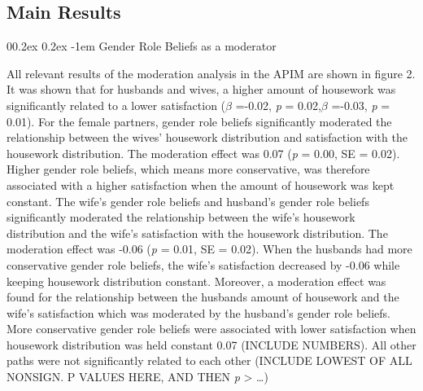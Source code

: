 \documentclass[
  man,floatsintext]{apa6}
\makeatletter
\let\oldparagraph\paragraph
\renewcommand{\paragraph}[1]{\oldparagraph{#1}\mbox{}}
\renewcommand{\paragraph}{\@startsection{paragraph}{4}{\parindent}%
  {0\baselineskip \@plus 0.2ex \@minus 0.2ex}%
  {-1em}%
  {\normalfont\normalsize\bfseries\itshape\typesectitle}}
\makeatother
\begin{document}
\hypertarget{main-results}{%
\subsection{Main Results}\label{main-results}}

\hypertarget{gender-role-beliefs-as-a-moderator}{%
\paragraph{Gender Role Beliefs as a moderator}\label{gender-role-beliefs-as-a-moderator}}

All relevant results of the moderation analysis in the APIM are shown in figure 2. It was shown that for husbands and wives, a higher amount of housework was significantly related to a lower satisfaction (\(\beta\) =-0.02, \emph{p} = 0.02,\(\beta\) =-0.03, \emph{p} = 0.01).
For the female partners, gender role beliefs significantly moderated the relationship between the wives' housework distribution and satisfaction with the housework distribution. The moderation effect was 0.07 (\emph{p} = 0.00, SE = 0.02). Higher gender role beliefs, which means more conservative, was therefore associated with a higher satisfaction when the amount of housework was kept constant. The wife's gender role beliefs and husband's gender role beliefs significantly moderated the relationship between the wife's housework distribution and the wife's satisfaction with the housework distribution. The moderation effect was -0.06 (\emph{p} = 0.01, SE = 0.02). When the husbands had more conservative gender role beliefs, the wife's satisfaction decreased by -0.06 while keeping housework distribution constant.
Moreover, a moderation effect was found for the relationship between the husbands amount of housework and the wife's satisfaction which was moderated by the husband's gender role beliefs. More conservative gender role beliefs were associated with lower satisfaction when housework distribution was held constant 0.07 (INCLUDE NUMBERS).
All other paths were not significantly related to each other (INCLUDE LOWEST OF ALL NONSIGN. P VALUES HERE, AND THEN \emph{p} \textgreater{} \ldots)
\end{document}
